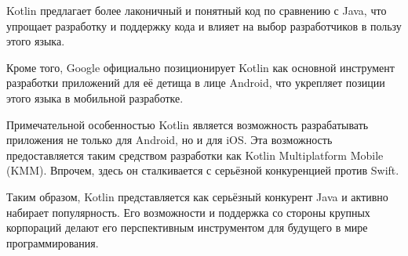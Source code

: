 Kotlin предлагает более лаконичный и понятный код по сравнению с Java, что упрощает разработку и поддержку кода и влияет на выбор разработчиков в пользу этого языка.

Кроме того, Google официально позиционирует Kotlin как основной инструмент разработки приложений для её детища в лице Android, что укрепляет позиции этого языка в мобильной разработке.

Примечательной особенностью Kotlin является возможность разрабатывать приложения не только для Android, но и для iOS. Эта возможность предоставляется таким средством разработки как Kotlin Multiplatform Mobile (KMM). Впрочем, здесь он сталкивается с серьёзной конкуренцией против Swift.

Таким образом, Kotlin представляется как серьёзный конкурент Java и активно набирает популярность. Его возможности и поддержка со стороны крупных корпораций делают его перспективным инструментом для будущего в мире программирования.